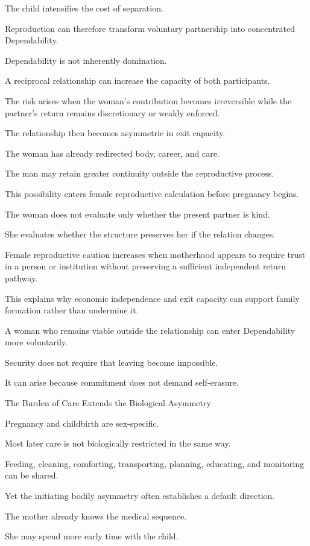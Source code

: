 The child intensifies the cost of separation.

Reproduction can therefore transform voluntary partnership into concentrated Dependability.

Dependability is not inherently domination.

A reciprocal relationship can increase the capacity of both participants.

The risk arises when the woman’s contribution becomes irreversible while the partner’s return remains discretionary or weakly enforced.

The relationship then becomes asymmetric in exit capacity.

The woman has already redirected body, career, and care.

The man may retain greater continuity outside the reproductive process.

This possibility enters female reproductive calculation before pregnancy begins.

The woman does not evaluate only whether the present partner is kind.

She evaluates whether the structure preserves her if the relation changes.

Female reproductive caution increases when motherhood appears to require trust in a person or institution without preserving a sufficient independent return pathway.

This explains why economic independence and exit capacity can support family formation rather than undermine it.

A woman who remains viable outside the relationship can enter Dependability more voluntarily.

Security does not require that leaving become impossible.

It can arise because commitment does not demand self-erasure.

The Burden of Care Extends the Biological Asymmetry

Pregnancy and childbirth are sex-specific.

Most later care is not biologically restricted in the same way.

Feeding, cleaning, comforting, transporting, planning, educating, and monitoring can be shared.

Yet the initiating bodily asymmetry often establishes a default direction.

The mother already knows the medical sequence.

She may spend more early time with the child.

